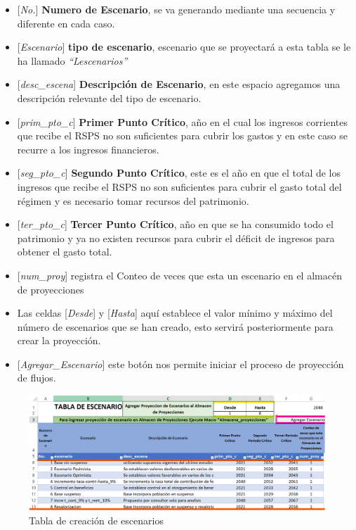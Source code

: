 \documentclass[
  letterpaper,
  DIV=11,
  numbers=noendperiod]{scrreprt}
\begin{document}
\begin{itemize}
\item
  {[}\emph{No.}{]} \textbf{Numero de Escenario}, se va generando
  mediante una secuencia y diferente en cada caso.
\item
  {[}\emph{Escenario}{]} \textbf{tipo de escenario}, escenario que se
  proyectará a esta tabla se le ha llamado \emph{``Lescenarios''}
\item
  {[}\emph{desc\_escena}{]} \textbf{Descripción de Escenario}, en este
  espacio agregamos una descripción relevante del tipo de escenario.
\item
  {[}\emph{prim\_pto\_c}{]} \textbf{Primer Punto Crítico}, año en el
  cual los ingresos corrientes que recibe el RSPS no son suficientes
  para cubrir los gastos y en este caso se recurre a los ingresos
  financieros.
\item
  {[}\emph{seg\_pto\_c}{]} \textbf{Segundo Punto Crítico}, este es el
  año en que el total de los ingresos que recibe el RSPS no son
  suficientes para cubrir el gasto total del régimen y es necesario
  tomar recursos del patrimonio.
\item
  {[}\emph{ter\_pto\_c}{]} \textbf{Tercer Punto Crítico}, año en que se
  ha consumido todo el patrimonio y ya no existen recursos para cubrir
  el déficit de ingresos para obtener el gasto total.
\item
  {[}\emph{num\_proy}{]} registra el Conteo de veces que esta un
  escenario en el almacén de proyecciones
\item
  Las celdas {[}\emph{Desde}{]} y {[}\emph{Hasta}{]} aquí establece el
  valor mínimo y máximo del número de escenarios que se han creado, esto
  servirá posteriormente para crear la proyección.
\item
  {[}\emph{Agregar\_Escenario}{]} este botón nos permite iniciar el
  proceso de proyección de flujos.
\end{itemize}

\begin{figure}

{\centering \includegraphics{images/F/Img13.png}

}

\caption{Tabla de creación de escenarios}

\end{figure}
\end{document}
